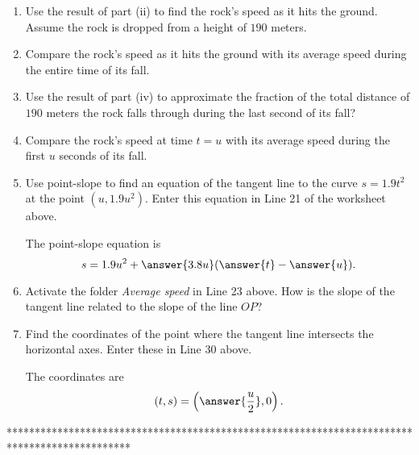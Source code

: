 \documentclass{ximera}
\begin{document}
\begin{exploration}
\begin{enumerate}
\begin{enumerate}
\item Use the result of part (ii) to find the rock's speed as it hits the ground. Assume the rock is dropped from a height of $190$ meters.

\item Compare the rock's speed as it hits the ground with its average speed during the entire time of its fall.

\item  Use the result of part (iv) to approximate the fraction of the total distance of $190$ meters the rock falls through during the last second of its fall? 

\item Compare the rock's speed at time $t=u$ with its average speed during the first $u$ seconds of its fall.

\item Use point-slope to find an equation of the tangent line to the curve $s=1.9t^2$ at the point $(u,1.9u^2)$. Enter this equation in Line 21 of the worksheet above.

The point-slope equation is
\[
     s = 1.9u^2 + \answer{3.8u} ( \answer{t} - \answer{u}) .
\]

\item Activate the folder \emph{Average speed} in Line 23 above. How is the slope of the tangent line related to the slope of the line $OP$?

\item Find the coordinates of the point where the tangent line intersects the horizontal axes. Enter these in Line 30 above.

The coordinates are
\[
  (t,s) = \left( \answer{\frac{u}{2}} , 0 \right) .
\]


\end{enumerate}


\end{enumerate}

\end{exploration}

**********************************************************************************************
\fi
\end{document}
